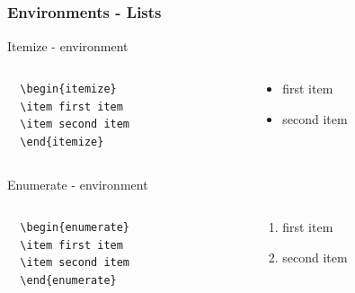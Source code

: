 \documentclass[[newPxFont]{beamer}
\begin{document}
\subsection{}
\begin{frame}[fragile=singleslide]
  \frametitle{Environments - Lists}
  \vspace{-0.25cm}
\begin{block}{Itemize - environment}
\vspace{-0.5cm}
\begin{columns}
  \begin{column}{.5\textwidth}
\begin{verbatim}
  \begin{itemize}
  \item first item
  \item second item
  \end{itemize}
\end{verbatim}
  \end{column}
  \begin{column}{.5\textwidth}
\begin{itemize}
\item first item
\item second item
\end{itemize}
  \end{column}
\end{columns}
\end{block}
  \vspace{-0.25cm}
\begin{block}{Enumerate - environment}
\vspace{-0.5cm}
\begin{columns}
  \begin{column}{.5\textwidth}
\begin{verbatim}
  \begin{enumerate}
  \item first item
  \item second item
  \end{enumerate}
\end{verbatim}
  \end{column}
  \begin{column}{.5\textwidth}
\begin{enumerate}
\item first item
\item second item
\end{enumerate}
\end{column}
\end{columns}
\end{block}

\end{frame}
\end{document}

